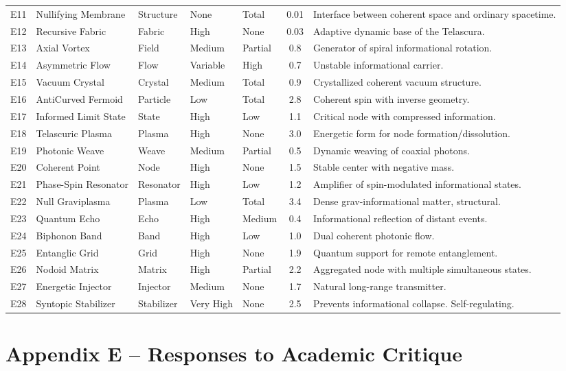 \documentclass[12pt]{article}
\begin{document}
\begin{longtable}{|c|l|l|l|l|c|p{6cm}|}
E11 & Nullifying Membrane & Structure & None & Total & 0.01 & Interface between coherent space and ordinary spacetime. \\
E12 & Recursive Fabric & Fabric & High & None & 0.03 & Adaptive dynamic base of the Telascura. \\
E13 & Axial Vortex & Field & Medium & Partial & 0.8 & Generator of spiral informational rotation. \\
E14 & Asymmetric Flow & Flow & Variable & High & 0.7 & Unstable informational carrier. \\
E15 & Vacuum Crystal & Crystal & Medium & Total & 0.9 & Crystallized coherent vacuum structure. \\
E16 & AntiCurved Fermoid & Particle & Low & Total & 2.8 & Coherent spin with inverse geometry. \\
E17 & Informed Limit State & State & High & Low & 1.1 & Critical node with compressed information. \\
E18 & Telascuric Plasma & Plasma & High & None & 3.0 & Energetic form for node formation/dissolution. \\
E19 & Photonic Weave & Weave & Medium & Partial & 0.5 & Dynamic weaving of coaxial photons. \\
E20 & Coherent Point & Node & High & None & 1.5 & Stable center with negative mass. \\
E21 & Phase-Spin Resonator & Resonator & High & Low & 1.2 & Amplifier of spin-modulated informational states. \\
E22 & Null Graviplasma & Plasma & Low & Total & 3.4 & Dense grav-informational matter, structural. \\
E23 & Quantum Echo & Echo & High & Medium & 0.4 & Informational reflection of distant events. \\
E24 & Biphonon Band & Band & High & Low & 1.0 & Dual coherent photonic flow. \\
E25 & Entanglic Grid & Grid & High & None & 1.9 & Quantum support for remote entanglement. \\
E26 & Nodoid Matrix & Matrix & High & Partial & 2.2 & Aggregated node with multiple simultaneous states. \\
E27 & Energetic Injector & Injector & Medium & None & 1.7 & Natural long-range transmitter. \\
E28 & Syntopic Stabilizer & Stabilizer & Very High & None & 2.5 & Prevents informational collapse. Self-regulating. \\
\hline
\end{longtable}
\section*{Appendix E – Responses to Academic Critique}
\end{document}
